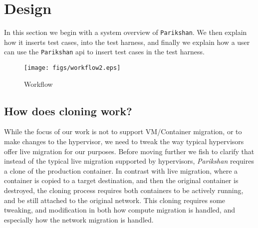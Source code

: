 
\section{Design}
\label{sec:design}

In this section we begin with a system overview of \texttt{Parikshan}. 
We then explain how it inserts test cases, into the test harness, and finally we explain how a user can use the \texttt{Parikshan} api to insert test cases in the test harness.

\begin{figure*}[t]
  \begin{center}
    \texttt{[image: figs/workflow2.eps]}
    \caption{Workflow}
    \label{fig:Backend wrapped around with Parakishan Run-time}
  \end{center}
\end{figure*}

\subsection{How does cloning work?}

While the focus of our work is not to support VM/Container migration, or to make changes to the hypervisor, we need to tweak the way typical hypervisors offer live migration for our purposes.
Before moving further we fish to clarify that instead of the typical live migration supported by hypervisors, \textit{Parikshan} requires a clone of the production container. 
In contrast with live migration, where a container is copied to a target destination, and then the original container is destroyed, the cloning process requires both containers to be actively running, and be still attached to the original network.
This cloning requires some tweaking, and modification in both how compute migration is handled, and especially how the network migration is handled. 

